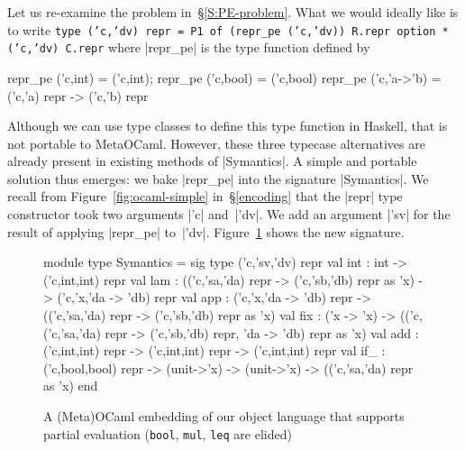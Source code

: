 Let us re-examine the problem in~\S\ref{S:PE-problem}. What we
would ideally like is to write
\begingroup\sloppy
\texttt{type ('c,'dv) repr = P1 of (repr\_pe ('c,'dv)) R.repr option * ('c,'dv) C.repr}
where |repr_pe| is the type function defined
by
\begin{code3}
repr_pe ('c,int) = ('c,int); repr_pe ('c,bool) = ('c,bool)
repr_pe ('c,'a->'b) = ('c,'a) repr -> ('c,'b) repr
\end{code3}
\endgroup\noindent
Although we can use type classes to define this type function
in Haskell, that is not portable to MetaOCaml. However,
these three typecase alternatives are already present in existing
methods of |Symantics|.
A simple and portable solution thus emerges: we bake |repr_pe| 
into the signature |Symantics|. 
We recall from Figure~\ref{fig:ocaml-simple} in~\S\ref{encoding} that the |repr| type
constructor took two arguments |'c| and~|'dv|. We add an argument
|'sv| for the result of applying |repr_pe| to~|'dv|.
Figure~\ref{fig:ocaml} shows the new signature.
\begin{figure}
\begin{floatrule}
\smallskip
\begin{code2}
module type Symantics = sig type ('c,'sv,'dv) repr
  val int : int -> ('c,int,int) repr
  val lam : (('c,'sa,'da) repr -> ('c,'sb,'db) repr as 'x)
            -> ('c,'x,'da -> 'db) repr
  val app : ('c,'x,'da -> 'db) repr
            -> (('c,'sa,'da) repr -> ('c,'sb,'db) repr as 'x)
  val fix : ('x -> 'x) -> (('c, ('c,'sa,'da) repr -> ('c,'sb,'db) repr,
                                'da -> 'db) repr as 'x)
  val add : ('c,int,int) repr -> ('c,int,int) repr -> ('c,int,int) repr
  val if_ : ('c,bool,bool) repr
            -> (unit->'x) -> (unit->'x) -> (('c,'sa,'da) repr as 'x) end
\end{code2}
\medskip
\end{floatrule}
\caption{A (Meta)OCaml embedding of our object language that supports
  partial evaluation \ifshort \protect\linebreak[2] (\texttt{bool},
  \texttt{mul}, \texttt{leq} are elided)\fi}
\label{fig:ocaml}
\end{figure}

